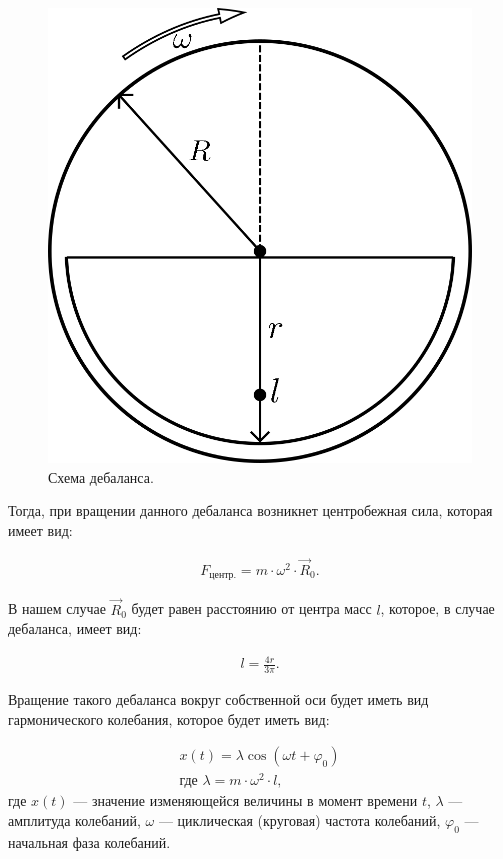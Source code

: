 \begin{figure}[h]
    \centering
    \includegraphics[width=0.4\linewidth]{img/debalance.png}
    \caption{Схема дебаланса.}
    \label{fig:debalance}
\end{figure}

Тогда, при вращении данного дебаланса возникнет центробежная сила, которая имеет вид:

\begin{equation}\label{eq:centrifugal}
    \begin{gathered}
        F_{\textrm{центр.}} = m \cdot \omega^2 \cdot \vec{R}_0.
    \end{gathered}
\end{equation}

В нашем случае $\vec{R}_0$ будет равен расстоянию от центра масс $l$, которое, в случае дебаланса, имеет вид:

\begin{equation}\label{eq:distance_mass}
    \begin{gathered}
        l = \frac{4 r}{3 \pi}.
    \end{gathered}
\end{equation}

Вращение такого дебаланса вокруг собственной оси будет иметь вид гармонического колебания, которое будет иметь вид:

\begin{equation}\label{eq:harmonic}
    \begin{gathered}
        x(t) = \lambda \cos (\omega t + \varphi_0) \\
        \textrm{где } \lambda = m \cdot \omega^2 \cdot l,
    \end{gathered}
\end{equation}
\noindent где $x(t)$  — значение изменяющейся величины в момент времени $t$, $\lambda$ — амплитуда колебаний,
$\omega$ — циклическая (круговая) частота колебаний, $\varphi_0$ — начальная фаза колебаний.

